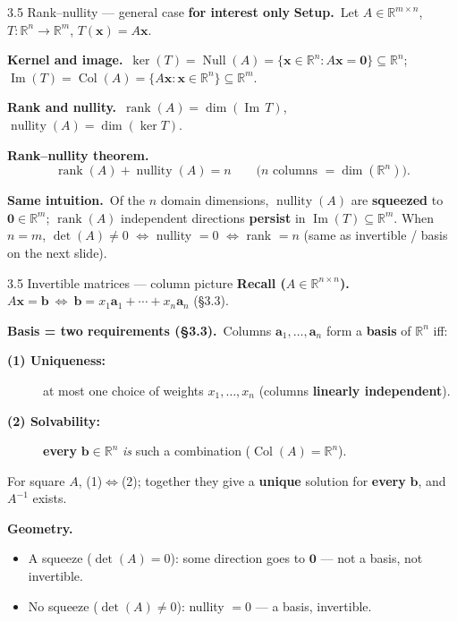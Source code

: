 \documentclass[11pt,aspectratio=169]{beamer}
\newcommand{\InterestOnly}{\textcolor{mAccent}{\textbf{for interest only}}}
\begin{document}
\begin{frame}{3.5 Rank--nullity --- general case \InterestOnly}
  \footnotesize
  \textbf{Setup.}\
  Let $A\in\mathbb{R}^{m\times n}$, $T:\mathbb{R}^n\to\mathbb{R}^m$, $T(\mathbf{x})=A\mathbf{x}$.

  \medskip
  \textbf{Kernel and image.}\
  $\ker(T)=\operatorname{Null}(A)=\{\mathbf{x}\in\mathbb{R}^n:A\mathbf{x}=\mathbf{0}\}\subseteq\mathbb{R}^n$;
  \quad
  $\operatorname{Im}(T)=\operatorname{Col}(A)=\{A\mathbf{x}:\mathbf{x}\in\mathbb{R}^n\}\subseteq\mathbb{R}^m$.

  \medskip
  \textbf{Rank and nullity.}\
  $\operatorname{rank}(A)=\dim(\operatorname{Im}\,T)$,
  \quad
  $\operatorname{nullity}(A)=\dim(\ker T)$.

  \medskip
  \textbf{Rank--nullity theorem.}\
  \[
    \operatorname{rank}(A)+\operatorname{nullity}(A)=n
    \qquad\text{($n$ columns $=\dim(\mathbb{R}^n)$).}
  \]

  \medskip
  \textbf{Same intuition.}\
  Of the $n$ domain dimensions, $\operatorname{nullity}(A)$ are \textbf{squeezed} to
  $\mathbf{0}\in\mathbb{R}^m$; $\operatorname{rank}(A)$ independent directions
  \textbf{persist} in $\operatorname{Im}(T)\subseteq\mathbb{R}^m$.
  When $n=m$, $\det(A)\neq 0$ $\Leftrightarrow$ nullity $=0$ $\Leftrightarrow$ rank $=n$
  (same as invertible / basis on the next slide).
\end{frame}

\begin{frame}{3.5 Invertible matrices --- column picture}
  \footnotesize
  \textbf{Recall ($A\in\mathbb{R}^{n\times n}$).}\
  $A\mathbf{x}=\mathbf{b}\ \Longleftrightarrow\
  \mathbf{b}=x_1\mathbf{a}_1+\cdots+x_n\mathbf{a}_n$ (§3.3).

  \medskip
  \textbf{Basis = two requirements (§3.3).}\
  Columns $\mathbf{a}_1,\ldots,\mathbf{a}_n$ form a \textbf{basis} of $\mathbb{R}^n$ iff:
  \begin{description}
    \item[\textbf{(1) Uniqueness:}] at most one choice of weights $x_1,\ldots,x_n$
      (columns \textbf{linearly independent}).
    \item[\textbf{(2) Solvability:}] \textbf{every} $\mathbf{b}\in\mathbb{R}^n$ \emph{is} such a combination
      ($\operatorname{Col}(A)=\mathbb{R}^n$).
  \end{description}
  For square $A$, (1)$\Leftrightarrow$(2); together they give a \textbf{unique} solution for
  \textbf{every} $\mathbf{b}$, and $A^{-1}$ exists.

  \medskip
  \textbf{Geometry.}
  \begin{itemize}
    \item A squeeze ($\det(A)=0$): some direction goes to $\mathbf{0}$ --- not a basis, not invertible.

    \item No squeeze ($\det(A)\neq 0$): nullity $=0$ --- a basis, invertible.
  \end{itemize}
\end{frame}
\end{document}
